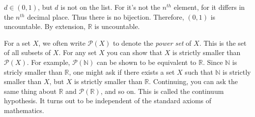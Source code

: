             $d\in(0,1)$, but $d$ is not on the list. For it's not
            the $n^{th}$ element, for it differs in the
            $n^{th}$ decimal place. Thus there is no bijection.
            Therefore, $(0,1)$ is uncountable. By extension,
            $\mathbb{R}$ is uncountable.
            \par\hfill\par
            \vspace{-2ex}
            For a set $X$, we often write
            $\mathcal{P}(X)$ to denote the
            \textit{power set} of $X$. This is the
            set of all subsets of $X$.
            For any set $X$ you can show that $X$ is
            strictly smaller than $\mathcal{P}(X)$.
            For example, $\mathcal{P}(\mathbb{N})$
            can be shown to be equivalent to $\mathbb{R}$.
            Since $\mathbb{N}$ is stricly smaller than
            $\mathbb{R}$, one might ask if there exists
            a set $X$ such that $\mathbb{N}$ is strictly
            smaller than $X$, but $X$ is strictly smaller
            than $\mathbb{R}$. Continuing, you can ask the
            same thing about $\mathbb{R}$ and
            $\mathcal{P}(\mathbb{R})$, and so on.
            This is called the continuum hypothesis.
            It turns out to be independent of
            the standard axioms of mathematics.
